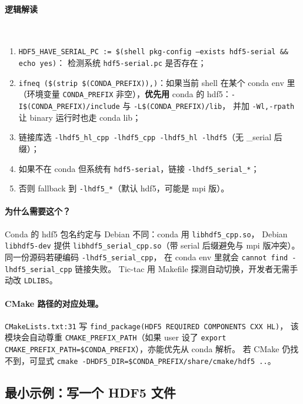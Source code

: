 \paragraph{逻辑解读}\

\begin{enumerate}
\item \texttt{HDF5\_HAVE\_SERIAL\_PC := \$(shell pkg-config --exists hdf5-serial \&\& echo yes)}：
      检测系统 \texttt{hdf5-serial.pc} 是否存在；
\item \texttt{ifneq (\$(strip \$(CONDA\_PREFIX)),)}：如果当前 shell 在某个
      conda env 里（环境变量 \texttt{CONDA\_PREFIX} 非空），\textbf{优先用} conda
      的 hdf5：\texttt{-I\$(CONDA\_PREFIX)/include} 与 \texttt{-L\$(CONDA\_PREFIX)/lib}，
      并加 \texttt{-Wl,-rpath} 让 binary 运行时也走 conda lib；
\item 链接库选 \texttt{-lhdf5\_hl\_cpp -lhdf5\_cpp -lhdf5\_hl -lhdf5}（无 \_serial 后缀）；
\item 如果不在 conda 但系统有 \texttt{hdf5-serial}，链接 \texttt{-lhdf5\_serial\_*}；
\item 否则 fallback 到 \texttt{-lhdf5\_*}（默认 hdf5，可能是 mpi 版）。
\end{enumerate}

\paragraph{为什么需要这个？}
Conda 的 hdf5 包名约定与 Debian 不同：conda 用 \texttt{libhdf5\_cpp.so}，
Debian \texttt{libhdf5-dev} 提供 \texttt{libhdf5\_serial\_cpp.so}（带 serial
后缀避免与 mpi 版冲突）。同一份源码若硬编码 \texttt{-lhdf5\_serial\_cpp}，
在 conda env 里就会 \texttt{cannot find -lhdf5\_serial\_cpp} 链接失败。
Tic-tac 用 Makefile 探测自动切换，开发者无需手动改 \texttt{LDLIBS}。

\paragraph{CMake 路径的对应处理。}
\texttt{CMakeLists.txt:31} 写 \texttt{find\_package(HDF5 REQUIRED COMPONENTS CXX HL)}，
该模块会自动尊重 \texttt{CMAKE\_PREFIX\_PATH}（如果 user 设了
\texttt{export CMAKE\_PREFIX\_PATH=\$CONDA\_PREFIX}），亦能优先从 conda 解析。
若 CMake 仍找不到，可显式 \texttt{cmake -DHDF5\_DIR=\$CONDA\_PREFIX/share/cmake/hdf5 ..}。

\subsection{最小示例：写一个 HDF5 文件}

